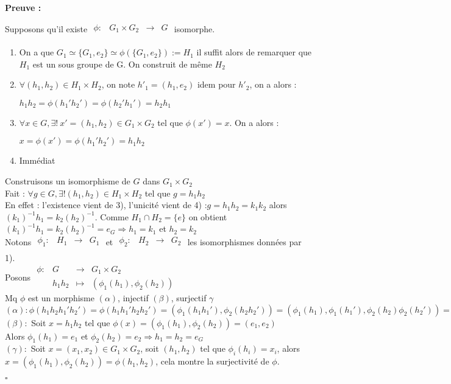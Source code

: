 \documentclass{report}
\renewenvironment{leftbar}{%
  \def\FrameCommand{\vrule width 0.4pt \hspace{10pt}}%
  \MakeFramed {\advance\hsize-\width \FrameRestore}}%
 {\endMakeFramed}%
\newenvironment{preuve}{\vspace*{0.5cm}
    \begin{leftbar}
    \noindent\textbf{Preuve :}\par}{
    \begin{flushright}
    $\square$
    \end{flushright}
    \end{leftbar}
}
\newcommand{\fonction}[5]{
    \begin{array}{l|rcl}
    #1: & #2 & \longrightarrow & #3 \\
        & #4 & \longmapsto & #5 
    \end{array}
}
\newcommand{\fctsarg}[3]{
    \begin{array}{lrcl}
    #1: & #2 & \longrightarrow & #3 \\
    \end{array}
}
\newcommand{\dsp}{\displaystyle}
\begin{document}
\begin{preuve}
    \fbox{$\Rightarrow$} Supposons qu'il existe $\fctsarg{\phi}{G_1 \times G_2}{G}$ isomorphe.\par
    
    \begin{enumerate}
    \item On a que $ G_{1}\simeq \{G_{1},e_{2}\} \simeq \phi\left(\{G_{1},e_{2}\}\right):=H_{1} $ il suffit alors de remarquer que $H_{1}$ est un sous groupe de G. On construit de même $H_{2}$
    \item$\forall (h_{1},h_{2})\in H_{1}\times H_{2}$, on note $h'_{1}= (h_{1},e_{2})$ idem pour $h'_{2}$, on a alors : 
    \begin{center}
    $\dsp h_1 h_2 = \phi(h_1 'h_2 ') = \phi(h_2 'h_1 ') = h_2 h_1 $
    \end{center}
    
    \item $\forall x \in G, \exists!~x'=(h_{1},h_{2})\in G_{1}\times G_{2}$ tel que $\phi(x')=x$. On a alors :  \par
    \begin{center}
    $\dsp x = \phi(x') = \phi(h_{1}'h_{2}') = h_{1}h_{2} $
    \end{center}
    \item Immédiat
    \end{enumerate}
    \noindent\fbox{$\Leftarrow$} Construisons un isomorphisme de $G$ dans $G_1 \times G_2$\\
    Fait : $\forall g\in G, \exists! (h_1,h_2)\in H_1 \times H_2 $ tel que $g = h_1 h_2$\\
    En effet : l'existence vient de 3), l'unicité vient de 4) :$g = h_1 h_2 = k_1 k_2$ alors $(k_1)^{-1} h_1 = k_2 (h_2)^{-1}$. Comme $H_1 \cap H_2 = \{e\}$ on obtient $(k_1)^{-1} h_1 = k_2 (h_2)^{-1} = e_G \Rightarrow h_1 = k_1 $ et $h_2 = k_2$\\
    Notons $\fctsarg{\phi_1}{H_1}{G_1}$ et $\fctsarg{\phi_2}{H_2}{G_2}$ les isomorphismes données par 1).\\
    Posons $\fonction{\phi}{G}{G_1 \times G_2}{h_1 h_2}{(\phi_1 (h_1),\phi_2 (h_2))}$\\
    Mq $\phi$ est un morphisme $(\alpha)$, injectif $(\beta)$, surjectif $\gamma$\\
    $(\alpha): \phi(h_1 h_2 h_1 'h_2 ') =\phi(h_1 h_1 'h_2 h_2') = (\phi_1(h_1 h_1'),\phi_2(h_2 h_2 ')) = (\phi_1(h_1),\phi_1(h_1 '),\phi_2(h_2)\phi_2(h_2 ')) = (\phi_1 (h_1),\phi_2 (h_2)) (\phi_1 (h_1 '),\phi_2(h_2 ')) = \phi(g)\phi(g')$\\
    $(\beta):$ Soit $x = h_1 h_2$ tel que $\phi(x) = (\phi_1 (h_1),\phi_2 (h_2)) = (e_1,e_2)$\\
    Alors $\phi_1(h_1) = e_1$ et $\phi_2 (h_2) = e_2 \Rightarrow h_1 = h_2 = e_G$\\
    $(\gamma):$ Soit $x = (x_1,x_2) \in G_1 \times G_2$, soit $(h_1,h_2)$ tel que $\phi_i (h_i) = x_i$, alors $x = (\phi_1 (h_1),\phi_2 (h_2)) = \phi(h_1,h_2)$, cela montre la surjectivité de $\phi$.
\end{preuve}
\end{document}

